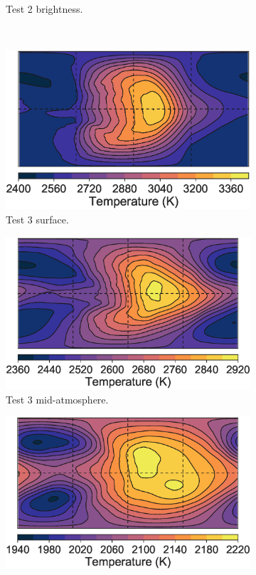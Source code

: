 \begin{figure}
\begin{subfigure}[t]{0.32\textwidth}
    \caption{Test 2 brightness.}
    \label{fig:free-h-shear}
  \end{subfigure}
  \\
  \begin{subfigure}[t]{0.32\textwidth}
    \includegraphics[width=\textwidth]{figures/linking-climate-55cnce/10sh_surfp.eps}
    \caption{Test 3 surface.}
    \label{fig:free-u-shear}
  \end{subfigure}
\enskip
  \begin{subfigure}[t]{0.32\textwidth}
    \includegraphics[width=\textwidth]{figures/linking-climate-55cnce/10sh_halfp.eps}
    \caption{Test 3 mid-atmosphere.}
    \label{fig:free-v-shear}
  \end{subfigure}
\enskip
  \begin{subfigure}[t]{0.32\textwidth}
    \includegraphics[width=\textwidth]{figures/linking-climate-55cnce/10sh_brightT.eps}

\end{subfigure}
\end{figure}
